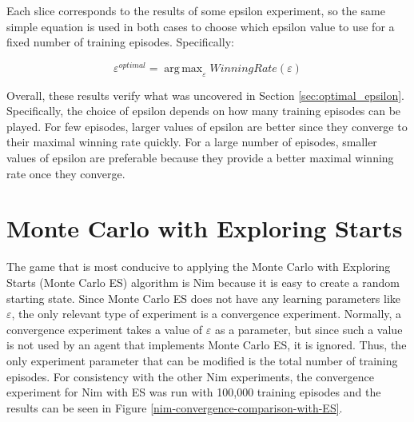 \documentclass[11pt,a4paper]{report}
\newcommand{\argmax}{\mathop{\mathrm{arg\,max}}}
\begin{document}
Each slice corresponds to the results of some epsilon experiment, so the same simple equation is used  in both cases to choose which epsilon value to use for a fixed number of training episodes. Specifically:

\begin{equation}
	\varepsilon^{optimal} = \argmax_{\varepsilon} WinningRate(\varepsilon)
\end{equation}

Overall, these results verify what was uncovered in Section \ref{sec:optimal_epsilon}. Specifically, the choice of epsilon depends on how many training episodes can be played. For few episodes, larger values of epsilon are better since they converge to their maximal winning rate quickly. For a large number of episodes, smaller values of epsilon are preferable because they provide a better maximal winning rate once they converge.


\section{Monte Carlo with Exploring Starts}
\label{sec:exploring-starts}

The game that is most conducive to applying the Monte Carlo with Exploring Starts (Monte Carlo ES) algorithm is Nim because it is easy to create a random starting state. Since Monte Carlo ES does not have any learning parameters like $\varepsilon$, the only relevant type of experiment is a convergence experiment. Normally, a convergence experiment takes a value of $\varepsilon$ as a parameter, but since such a value is not used by an agent that implements Monte Carlo ES, it is ignored. Thus, the only experiment parameter that can be modified is the total number of training episodes. For consistency with the other Nim experiments, the convergence experiment for Nim with ES was run with 100,000 training episodes and the results can be seen in Figure \ref{nim-convergence-comparison-with-ES}.
\end{document}
